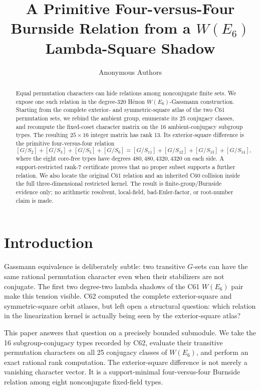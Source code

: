 \documentclass[11pt]{article}
\title{A Primitive Four-versus-Four Burnside Relation from a \texorpdfstring{$W(E_6)$}{W(E6)} Lambda-Square Shadow}
\author{Anonymous Authors}
\date{}
\begin{document}
\maketitle

\begin{abstract}
Equal permutation characters can hide relations among nonconjugate finite
sets.  We expose one such relation in the degree-320 H\'enon
\(W(E_6)\)-Gassmann construction.  Starting from the complete exterior- and
 symmetric-square atlas of the two C61 permutation sets, we rebind the
 ambient group, enumerate its 25 conjugacy classes, and recompute the
 fixed-coset character matrix on the 16 ambient-conjugacy subgroup types.
The resulting \(25\times16\) integer matrix has rank 13.  Its exterior-square
 difference is the primitive four-versus-four relation
\[
 [G/S_2]+[G/S_3]+[G/S_5]+[G/S_6]
 = [G/S_{11}]+[G/S_{12}]+[G/S_{13}]+[G/S_{14}],
\]
where the eight core-free types have degrees \(480,480,4320,4320\) on each
side.  A support-restricted rank-7 certificate proves that no proper subset
supports a further relation.  We also locate the original C61 relation and
an inherited C60 collision inside the full three-dimensional restricted
kernel.  The result is finite-group/Burnside evidence only; no arithmetic
resolvent, local-field, bad-Euler-factor, or root-number claim is made.
\end{abstract}

\section{Introduction}
Gassmann equivalence is deliberately subtle: two transitive \(G\)-sets can
have the same rational permutation character even when their stabilizers are
not conjugate.  The first two degree-two lambda shadows of the C61
\(W(E_6)\) pair make this tension visible.  C62 computed the complete
exterior-square and symmetric-square orbit atlases, but left open a structural
question: which relation in the linearization kernel is actually being seen by
the exterior-square atlas?

This paper answers that question on a precisely bounded submodule.  We take
the 16 subgroup-conjugacy types recorded by C62, evaluate their transitive
permutation characters on all 25 conjugacy classes of \(W(E_6)\), and perform
an exact rational rank computation.  The exterior-square difference is not
merely a vanishing character vector.  It is a support-minimal four-versus-four
Burnside relation among eight nonconjugate fixed-field types.
\end{document}
